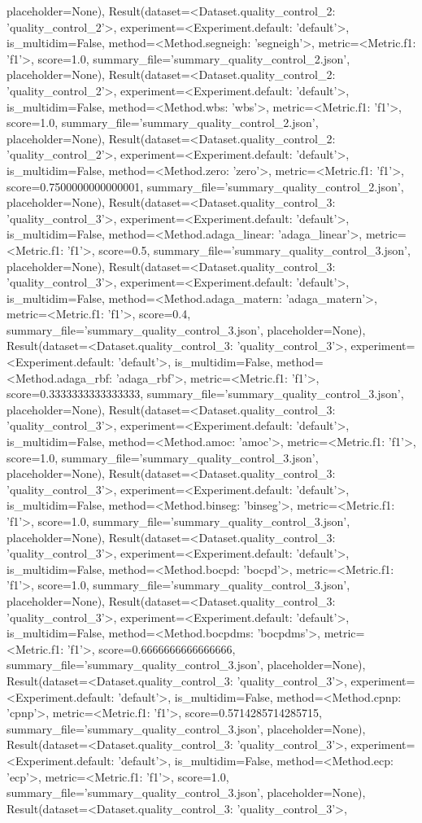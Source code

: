 placeholder=None), Result(dataset=<Dataset.quality_control_2: 'quality_control_2'>, experiment=<Experiment.default: 'default'>, is_multidim=False, method=<Method.segneigh: 'segneigh'>, metric=<Metric.f1: 'f1'>, score=1.0, summary_file='summary_quality_control_2.json', placeholder=None), Result(dataset=<Dataset.quality_control_2: 'quality_control_2'>, experiment=<Experiment.default: 'default'>, is_multidim=False, method=<Method.wbs: 'wbs'>, metric=<Metric.f1: 'f1'>, score=1.0, summary_file='summary_quality_control_2.json', placeholder=None), Result(dataset=<Dataset.quality_control_2: 'quality_control_2'>, experiment=<Experiment.default: 'default'>, is_multidim=False, method=<Method.zero: 'zero'>, metric=<Metric.f1: 'f1'>, score=0.7500000000000001, summary_file='summary_quality_control_2.json', placeholder=None), Result(dataset=<Dataset.quality_control_3: 'quality_control_3'>, experiment=<Experiment.default: 'default'>, is_multidim=False, method=<Method.adaga_linear: 'adaga_linear'>, metric=<Metric.f1: 'f1'>, score=0.5, summary_file='summary_quality_control_3.json', placeholder=None), Result(dataset=<Dataset.quality_control_3: 'quality_control_3'>, experiment=<Experiment.default: 'default'>, is_multidim=False, method=<Method.adaga_matern: 'adaga_matern'>, metric=<Metric.f1: 'f1'>, score=0.4, summary_file='summary_quality_control_3.json', placeholder=None), Result(dataset=<Dataset.quality_control_3: 'quality_control_3'>, experiment=<Experiment.default: 'default'>, is_multidim=False, method=<Method.adaga_rbf: 'adaga_rbf'>, metric=<Metric.f1: 'f1'>, score=0.3333333333333333, summary_file='summary_quality_control_3.json', placeholder=None), Result(dataset=<Dataset.quality_control_3: 'quality_control_3'>, experiment=<Experiment.default: 'default'>, is_multidim=False, method=<Method.amoc: 'amoc'>, metric=<Metric.f1: 'f1'>, score=1.0, summary_file='summary_quality_control_3.json', placeholder=None), Result(dataset=<Dataset.quality_control_3: 'quality_control_3'>, experiment=<Experiment.default: 'default'>, is_multidim=False, method=<Method.binseg: 'binseg'>, metric=<Metric.f1: 'f1'>, score=1.0, summary_file='summary_quality_control_3.json', placeholder=None), Result(dataset=<Dataset.quality_control_3: 'quality_control_3'>, experiment=<Experiment.default: 'default'>, is_multidim=False, method=<Method.bocpd: 'bocpd'>, metric=<Metric.f1: 'f1'>, score=1.0, summary_file='summary_quality_control_3.json', placeholder=None), Result(dataset=<Dataset.quality_control_3: 'quality_control_3'>, experiment=<Experiment.default: 'default'>, is_multidim=False, method=<Method.bocpdms: 'bocpdms'>, metric=<Metric.f1: 'f1'>, score=0.6666666666666666, summary_file='summary_quality_control_3.json', placeholder=None), Result(dataset=<Dataset.quality_control_3: 'quality_control_3'>, experiment=<Experiment.default: 'default'>, is_multidim=False, method=<Method.cpnp: 'cpnp'>, metric=<Metric.f1: 'f1'>, score=0.5714285714285715, summary_file='summary_quality_control_3.json', placeholder=None), Result(dataset=<Dataset.quality_control_3: 'quality_control_3'>, experiment=<Experiment.default: 'default'>, is_multidim=False, method=<Method.ecp: 'ecp'>, metric=<Metric.f1: 'f1'>, score=1.0, summary_file='summary_quality_control_3.json', placeholder=None), Result(dataset=<Dataset.quality_control_3: 'quality_control_3'>, 